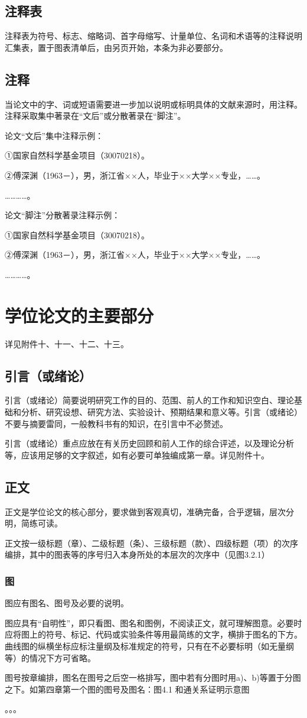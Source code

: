 \subsection{注释表}
注释表为符号、标志、缩略词、首字母缩写、计量单位、名词和术语等的注释说明汇集表，置于图表清单后，由另页开始，本条为非必要部分。

\subsection{注释}
当论文中的字、词或短语需要进一步加以说明或标明具体的文献来源时，用注释。注释采取集中著录在“文后”或分散著录在“脚注”。

论文“文后”集中注释示例：

①国家自然科学基金项目（30070218）。

②傅深渊（1963－），男，浙江省××人，毕业于××大学××专业，……。 

…………。

论文“脚注”分散著录注释示例：

①国家自然科学基金项目（30070218）。

②傅深渊（1963－），男，浙江省××人，毕业于××大学××专业，……。

…………。

\section{学位论文的主要部分}
详见附件十、十一、十二、十三。

\subsection{引言（或绪论）}
引言（或绪论）简要说明研究工作的目的、范围、前人的工作和知识空白、理论基础和分析、研究设想、研究方法、实验设计、预期结果和意义等。引言（或绪论）不要与摘要雷同，一般教科书有的知识，在引言中不必赘述。

引言（或绪论）重点应放在有关历史回顾和前人工作的综合评述，以及理论分析等，应该用足够的文字叙述，如有必要可单独编成第一章。详见附件十。

\subsection{正文}
正文是学位论文的核心部分，要求做到客观真切，准确完备，合乎逻辑，层次分明，简练可读。

正文按一级标题（章）、二级标题（条）、三级标题（款）、四级标题（项）的次序编排，其中的图表等的序号归入本身所处的本层次的次序中（见图3.2.1）

\subsubsection{图}
图应有图名、图号及必要的说明。

图应具有“自明性”，即只看图、图名和图例，不阅读正文，就可理解图意。必要时应将图上的符号、标记、代码或实验条件等用最简练的文字，横排于图名的下方。曲线图的纵横坐标应标注量纲及标准规定的符号，只有在不必要标明（如无量纲等）的情况下方可省略。

图号按章编排，图名在图号之后空一格排写，图中若有分图时用a)、b)等置于分图之下。如第四章第一个图的图号及图名：图4.1 和通关系证明示意图

。。。

